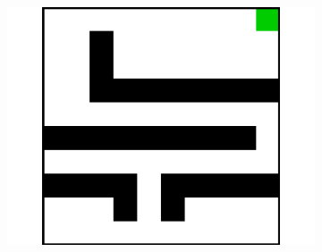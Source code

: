 \documentclass{article}
\begin{document}
\begin{figure}[t]
\begin{subfigure}[t]{0.18\textwidth}
    \includegraphics[width=\textwidth]{images/maze/maze4.pdf}
    \caption{}
  \end{subfigure}
  

\end{figure}
\end{document}
